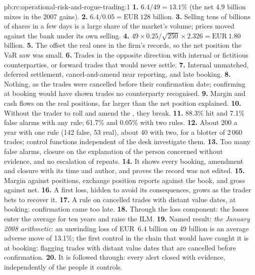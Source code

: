 \begin{solution}{pb:rc:operational-risk-and-rogue-trading:1}
\textbf{1.} $6.4/49 = 13.1\%$ (the net 4.9 billion mixes in the 2007 gains).
\textbf{2.} $6.4/0.05 = \text{EUR}~128$ billion.
\textbf{3.} Selling tens of billions of shares in a few days is a large share of the market's volume; prices
moved against the bank under its own selling.
\textbf{4.} $49\times0.25/\sqrt{250}\times2.326 = \text{EUR}~1.80$ billion.
\textbf{5.} The  offset the real ones in the firm's records, so the net position the VaR
saw was small.
\textbf{6.} Trades in the opposite direction with internal or fictitious counterparties, or forward trades
that would never settle.
\textbf{7.} Internal unmatched, deferred settlement, cancel-and-amend near reporting, and late booking.
\textbf{8.} Nothing, as the trades were cancelled before their confirmation date; confirming at booking would have shown trades no counterparty recognised.
\textbf{9.} Margin and cash flows on the real positions, far larger than the net position explained.
\textbf{10.} Without the trader to roll and amend the , they break.
\textbf{11.} 88.3\% hit and 7.1\% false alarms with any rule; 61.7\% and 0.05\% with two rules.
\textbf{12.} About 200 a year with one rule (142 false, 53 real), about 40 with two, for a blotter of
2\,060 trades; control functions independent of the desk investigate them.
\textbf{13.} Too many false alarms, closure on the explanation of the person concerned without evidence, and
no escalation of repeats.
\textbf{14.} It shows every booking, amendment and closure with its time and author, and proves the record
was not edited.
\textbf{15.} Margin against positions, exchange position reports against the book, and gross against net.
\textbf{16.} A first loss, hidden to avoid its consequences, grows as the trader bets to recover it.
\textbf{17.} A rule on cancelled trades with distant value dates, at booking: confirmation came too late.
\textbf{18.} Through the loss component: the losses enter the average for ten years and raise the ILM.
\textbf{19.} Named result: \emph{the January 2008 arithmetic}: an unwinding loss of EUR~6.4 billion on
49 billion is an average adverse move of 13.1\%; the first control in the chain that would have caught it is at
booking: flagging trades with distant value dates that are cancelled before confirmation.
\textbf{20.} It is followed through: every alert closed with evidence, independently of the people it controls.
\end{solution}

